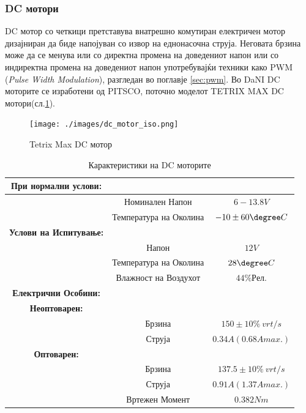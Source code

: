\documentclass[11pt]{article}
\begin{document}
	  \subsubsection{DC мотори}
		  DC мотор со четкици претставува внатрешно комутиран електричен мотор дизајниран да биде напојуван со извор на еднонасочна струја. Неговата брзина може да се менува или со директна промена на доведениот напон или со индиректна промена на доведениот напон употребувајќи техники како PWM (\textit{Pulse Width Modulation}), разгледан во поглавје \ref{sec:pwm}.
		  Во DaNI DC моторите се изработени од PITSCO, поточно моделот TETRIX MAX DC мотори(сл.\ref{fig:dc_motor_iso.png}).

		  \begin{figure}[H]
    	  \texttt{[image: ./images/dc\_motor\_iso.png]}
			  \centering
			  \caption{Tetrix Max DC мотор}
			  \label{fig:dc_motor_iso.png}
			  \end{figure}

      \begin{table}[H]
        \caption{Карактеристики на DC моторите}
        \label{tab:dcmotor}
        \begin{center}
          \begin{tabular}{||c|c|c||}
            \hline
            \textbf{При нормални услови:} & & \\
            \hline
             & Номинален Напон & $6-13.8V$\\
             & Температура на Околина & $-10 \pm 60 \degree C$\\
            \hline
            \textbf{Услови на Испитување:} & & \\
            \hline
            & Напон & $12V$ \\
            & Температура на Околина & $28 \degree C$\\
            & Влажност на Воздухот & $44\% Рел.$\\
            \hline
            \textbf{Електрични Особини:} & & \\
            \hline
            \textbf{Неоптоварен:} & & \\
            \hline
            & Брзина & $150 \pm 10 \%\ vrt/s$ \\
            & Струја & $0.34A (0.68 Amax.)$ \\
            \hline
            \textbf{Оптоварен:} & &\\
            \hline
            & Брзина & $137.5 \pm 10 \%\ vrt/s$ \\
            & Струја & $0.91A (1.37Amax.)$ \\
            & Вртежен Момент & $0.382Nm$ \\
            \hline
          \end{tabular}
        \end{center}
      \end{table}
\end{document}
